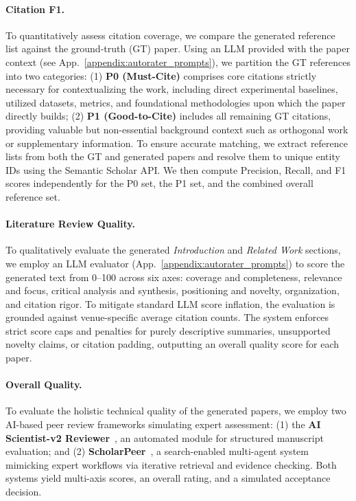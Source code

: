 \paragraph{Citation F1.} To quantitatively assess citation coverage, we compare the generated reference list against the ground-truth (GT) paper. Using an LLM provided with the paper context (see App.~\ref{appendix:autorater_prompts}), we partition the GT references into two categories: (1) \textbf{P0 (Must-Cite)} comprises core citations strictly necessary for contextualizing the work, including direct experimental baselines, utilized datasets, metrics, and foundational methodologies upon which the paper directly builds; (2) \textbf{P1 (Good-to-Cite)} includes all remaining GT citations, providing valuable but non-essential background context such as orthogonal work or supplementary information. To ensure accurate matching, we extract reference lists from both the GT and generated papers and resolve them to unique entity IDs using the Semantic Scholar API. We then compute Precision, Recall, and F1 scores independently for the P0 set, the P1 set, and the combined overall reference set.

\paragraph{Literature Review Quality.} To qualitatively evaluate the generated \textit{Introduction} and \textit{Related Work} sections, we employ an LLM evaluator (App.~\ref{appendix:autorater_prompts}) to score the generated text from 0--100 across six axes: coverage and completeness, relevance and focus, critical analysis and synthesis, positioning and novelty, organization, and citation rigor. To mitigate standard LLM score inflation, the evaluation is grounded against venue-specific average citation counts. The system enforces strict score caps and penalties for purely descriptive summaries, unsupported novelty claims, or citation padding, outputting an overall quality score for each paper.

\paragraph{Overall Quality.} To evaluate the holistic technical quality of the generated papers, we employ two AI-based peer review frameworks simulating expert assessment: (1) the \textbf{AI Scientist-v2 Reviewer}~\citep{yamada2025aiscientistv2}, an automated module for structured manuscript evaluation; and (2) \textbf{ScholarPeer}~\citep{goyal2026scholarpeer}, a search-enabled multi-agent system mimicking expert workflows via iterative retrieval and evidence checking. Both systems yield multi-axis scores, an overall rating, and a simulated acceptance decision.

